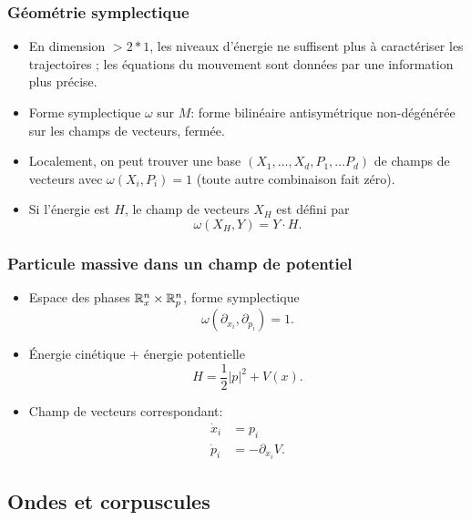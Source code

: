 \documentclass[mathserif]{beamer}
\begin{document}
      \begin{frame}
        \frametitle{Géométrie symplectique}
        \begin{itemize}
        \item En dimension $>2*1$, les niveaux d'énergie ne
          suffisent plus à caractériser les trajectoires ; les
          équations du mouvement sont données par une information plus
          précise.
        \item Forme symplectique $\omega$ sur $M$: forme bilinéaire
          antisymétrique non-dégénérée sur les champs de vecteurs,
          fermée.
        \item Localement, on peut trouver une base
          $(X_1,\ldots,X_d,P_1,\ldots P_d)$ de champs de vecteurs avec
          $\omega(X_i,P_i)=1$ (toute autre combinaison fait zéro).
        \item Si l'énergie est $H$, le champ de vecteurs $X_H$ est
          défini par
          \[
            \omega(X_H,Y)=Y\cdot H.
          \]
        \end{itemize}
      \end{frame}

      \begin{frame}
        \frametitle{Particule massive dans un champ de potentiel}
        \begin{itemize}
        \item Espace des phases $\mathbb{R}^{n}_x\times \mathbb{R}^{n}_p$, forme symplectique
          \[
            \omega(\partial_{x_i},\partial_{p_i})=1.
          \]
          
        \item Énergie cinétique + énergie potentielle
          \[
            H=\frac 12 |p|^2 + V(x).
          \]
          
        \item Champ de vecteurs correspondant:
          \begin{align*}
            \dot{x}_i&=p_i\\
            \dot{p}_i&=-\partial_{x_i}V.
          \end{align*}
        \end{itemize}
      \end{frame}

      \subsection{Ondes et corpuscules}
\end{document}
